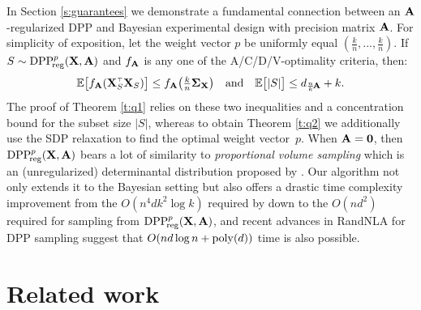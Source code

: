 \documentclass[thesis.tex]{subfiles}
\begin{document}
In Section \ref{s:guarantees} we demonstrate a fundamental connection between an
$\mathbf A$-regularized DPP and Bayesian experimental design with precision
matrix $\mathbf A$. For simplicity of exposition, let the weight vector $p$ be uniformly equal $(\frac kn,...,\frac kn)$. If
$S\sim{{\mathrm{DPP}}_{\!\mathrm{reg}}^{p}}(\mathbf X,\mathbf A)$ and $f_{\mathbf A}$ is any one of the
A/C/D/V-optimality criteria, then:
 \begin{align*}
   \E\big[f_{\A}(\X_S^\top\X_S)\big]
   \leq f_{\A}\big(\tfrac kn\Sigmab_{\X}\big)
   \quad\text{and}\quad \E\big[|S|\big]
   \leq d_{\frac nk\!\A}+k. 
 \end{align*}
The proof of Theorem \ref{t:q1} relies on these two inequalities and a
concentration bound for the subset size $|S|$,
whereas to obtain Theorem
\ref{t:q2} we additionally use the SDP relaxation to find the optimal
weight vector~$p$. When $\mathbf A=\mathbf 0$, then ${{\mathrm{DPP}}_{\!\mathrm{reg}}^{p}}(\mathbf X,\mathbf A)$ bears a
lot of similarity to 
\emph{proportional volume sampling} which is an (unregularized) determinantal
distribution proposed by \cite{proportional-volume-sampling}.
Our algorithm not only extends it to the Bayesian setting but also
offers a drastic time complexity improvement from 
the $O(n^4dk^2\log k)$ required by \cite{proportional-volume-sampling}
down to the $O(nd^2)$ required for sampling from ${{\mathrm{DPP}}_{\!\mathrm{reg}}^{p}}(\mathbf X,\mathbf A)$,
and recent advances in RandNLA for DPP sampling
\citep{leveraged-volume-sampling,correcting-bias,dpp-intermediate} suggest that
$O(nd\log n + {\mathrm{poly}}(d))$ time is also possible.





\section{Related work}
\label{s:related-work}
\end{document}
